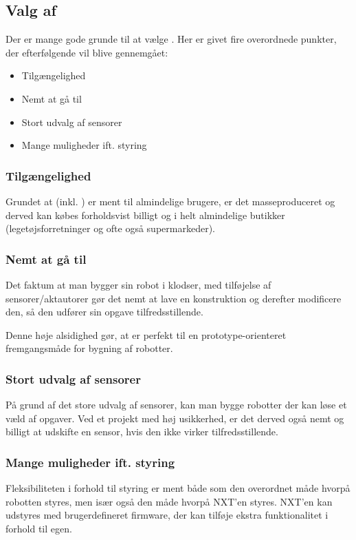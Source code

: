 \subsection{Valg af \legoms}
Der er mange gode grunde til at vælge \legoms.
Her er givet fire overordnede punkter, der efterfølgende vil blive gennemgået:

\begin{itemize}
\item{Tilgængelighed}
\item{Nemt at gå til}
\item{Stort udvalg af sensorer}
\item{Mange muligheder ift. styring}
\end{itemize}

\subsubsection{Tilgængelighed}
Grundet at \lego (inkl. \legoms) er ment til almindelige brugere, er det masseproduceret og derved kan købes forholdsvist billigt og i helt almindelige butikker (legetøjsforretninger og ofte også supermarkeder).

\subsubsection{Nemt at gå til}
Det faktum at man bygger sin robot i \lego klodser, med tilføjelse af \legoms sensorer/aktautorer gør det nemt at lave en konstruktion og derefter modificere den, så den udfører sin opgave tilfredsstillende.

Denne høje alsidighed gør, at \lego er perfekt til en prototype-orienteret fremgangsmåde for bygning af robotter.

\subsubsection{Stort udvalg af sensorer}
På grund af det store udvalg af sensorer, kan man bygge robotter der kan løse et væld af opgaver.
Ved et projekt med høj usikkerhed, er det derved også nemt og billigt at udskifte en sensor, hvis den ikke virker tilfredsstillende.

\subsubsection{Mange muligheder ift. styring}
Fleksibiliteten i forhold til styring er ment både som den overordnet  måde hvorpå robotten styres, men især også den måde hvorpå NXT'en styres.
NXT'en kan udstyres med brugerdefineret firmware, der kan tilføje ekstra funktionalitet i forhold til \legos egen.

